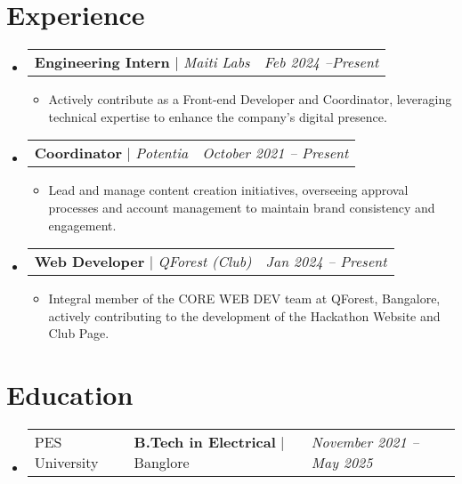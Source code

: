 \documentclass[letterpaper,10pt]{article}
\makeatletter
\newcommand{\subheadingtitlevspace}{
\vspace{-3pt}
}
\newcommand{\resumeItem}[1]{
  \item{
    {#1 \vspace{-4pt}}
  }
}
\newcommand{\titleItem}[1]{
  \textbf{#1}
}
\newcommand{\resumeSubheading}[4]{
  \item
     \begin{tabular*}{0.97\textwidth}[t]{l@{\extracolsep{\fill}}l@{}l}     
      {#1} & \titleItem{#3} | {#2} & \textit{#4}\\
    \end{tabular*}\vspace{-10pt}
}
\newcommand{\resumeProjectHeading}[2]{
    \item
    \begin{tabular*}{0.97\textwidth}{l@{\extracolsep{\fill}}r}
      #1 & \textit{ #2} \\
    \end{tabular*}\vspace{-9pt}
}
\newcommand{\resumeSubHeadingListStart}{\subheadingtitlevspace\begin{itemize}[leftmargin=0.15in, label={}]}
\newcommand{\resumeSubHeadingListEnd}{\end{itemize}}
\newcommand{\resumeItemListStart}{
\begin{itemize}}
\newcommand{\resumeItemListEnd}{
\end{itemize}\vspace{-8pt}}
\makeatother
\begin{document}
    

\section{Experience}
  \resumeSubHeadingListStart
      \resumeProjectHeading
           {\titleItem{{Engineering Intern}} $|$ \emph{Maiti Labs}}{Feb 2024 --Present}
      \resumeItemListStart
        \resumeItem{Actively contribute as a Front-end Developer and Coordinator, leveraging technical expertise to enhance the company's digital presence.}
      \resumeItemListEnd


    \resumeProjectHeading
           {\titleItem{{Coordinator}} $|$ \emph{Potentia}}{October 2021 -- Present}
      \resumeItemListStart
        \resumeItem{Lead and manage content creation initiatives, overseeing approval processes and account management to maintain brand consistency and engagement.}
        \resumeItemListEnd
        
    \resumeProjectHeading
           {\titleItem{{Web Developer}} $|$ \emph{QForest (Club)}}{Jan 2024 -- Present}
      \resumeItemListStart    
    \resumeItem{Integral member of the CORE WEB DEV team at QForest, Bangalore, actively contributing to the development of the Hackathon Website and Club Page.}
    \resumeItemListEnd
  \resumeSubHeadingListEnd



\section{Education}
  \resumeSubHeadingListStart
    \resumeSubheading
      {PES University}{Banglore}
      {B.Tech in Electrical}{November 2021 -- May 2025} 
  \resumeSubHeadingListEnd
\vspace{-8pt}

\end{document}
